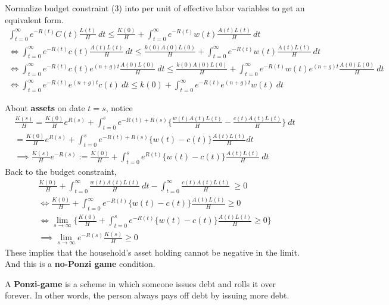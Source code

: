 \documentclass[]{article}
\begin{document}
	\par Normalize budget constraint (3) into per unit of effective labor variables to get an equivalent form.
	\begin{gather*}
		\int_{t=0}^\infty e^{-R(t)} C(t) \frac{L(t)}{H}\ dt  \leq \frac{K(0)}{H} + \int_{t=0}^\infty e^{-R(t)} w(t) \frac{A(t)L(t)}{H}\ dt \\
		\iff 
		\int_{t=0}^\infty e^{-R(t)} c(t) \frac{A(t)L(t)}{H}\ dt \leq \frac{k(0)A(0)L(0)}{H} + \int_{t=0}^\infty e^{-R(t)} w(t) \frac{A(t)L(t)}{H}\ dt \\ 
		\iff \int_{t=0}^\infty e^{-R(t)} c(t) e^{(n+g)t} \frac{A(0)L(0)}{H}\ dt \leq \frac{k(0)A(0)L(0)}{H} + \int_{t=0}^\infty e^{-R(t)} w(t) e^{(n+g)t}\frac{A(0)L(0)}{H}\ dt \\
		\iff \int_{t=0}^\infty e^{-R(t)} e^{(n+g)t} c(t)\ dt \leq k(0) + \int_{t=0}^\infty e^{-R(t)} e^{(n+g)t} w(t)\ dt
	\end{gather*}
	\par About \textbf{assets} on date $t=s$, notice
	\begin{gather*}
		\frac{K(s)}{H} = \frac{K(0)}{H}e^{R(s)} + \int_{t=0}^s e^{-R(t)+R(s)} \Big\{\frac{w(t)A(t)L(t)}{H} - \frac{c(t)A(t)L(t)}{H} \Big\}\ dt \\
		= \frac{K(0)}{H} e^{R(s)} +  \int_{t=0}^s e^{-R(t)+R(s)} \{w(t) - c(t)\} \frac{A(t)L(t)}{H} dt \\
		\implies \frac{K(s)}{H}e^{-R(s)} := \frac{K(0)}{H} + \int_{t=0}^s e^{R(t)} \{w(t) - c(t)\} \frac{A(t)L(t)}{H}\ dt
	\end{gather*}
	Back to the budget constraint,
	\begin{gather*}
		\frac{K(0)}{H} + \int_{t=0}^\infty \frac{w(t)A(t)L(t)}{H}\ dt - \int_{t=0}^\infty \frac{c(t)A(t)L(t)}{H}\ \geq 0 \\
		\iff \frac{K(0)}{H} + \int_{t=0}^\infty e^{-R(t)} \{w(t) - c(t)\} \frac{A(t)L(t)}{H} \geq 0 \\
		\iff \lim_{s \to \infty}\Big\{ \frac{K(0)}{H} + \int_{t=0}^s e^{-R(t)} \{w(t) - c(t)\} \frac{A(t)L(t)}{H} \geq 0 \Big \} \\
		\implies \lim_{s\to \infty}e^{-R(s)}\frac{K(s)}{H} \geq 0
	\end{gather*}
	These implies that the household's asset holding cannot be negative in the limit. And this is a \textbf{no-Ponzi game} condition.
	
	\begin{definition}
		A \textbf{Ponzi-game} is a scheme in which someone issues debt and rolls it over forever. In other words, the person always pays off debt by issuing more debt.
	\end{definition}
	
\end{document}
